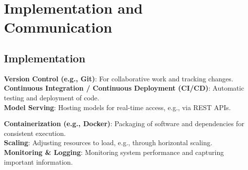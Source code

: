 \documentclass[english]{latex4ei/latex4ei_sheet}
\begin{document}
\section{Implementation and Communication}
\begin{sectionbox}
\subsection{Implementation}
    \textbf{Version Control (e.g., Git)}: For collaborative work and tracking changes.\\
    \textbf{Continuous Integration / Continuous Deployment (CI/CD)}: Automatic testing and deployment of code.\\
    \textbf{Model Serving}: Hosting models for real-time access, e.g., via REST APIs.
    \item \textbf{Containerization (e.g., Docker)}: Packaging of software and dependencies for consistent execution.\\
    \textbf{Scaling}: Adjusting resources to load, e.g., through horizontal scaling.\\
    \textbf{Monitoring \& Logging}: Monitoring system performance and capturing important information.
        

\end{sectionbox}
\end{document}

